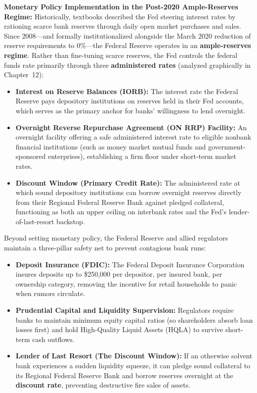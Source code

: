 \documentclass[11pt, oneside]{book}
\begin{document}
\textbf{Monetary Policy Implementation in the Post-2020 Ample-Reserves Regime:} Historically, textbooks described the Fed steering interest rates by rationing scarce bank reserves through daily open market purchases and sales. Since 2008—and formally institutionalized alongside the March 2020 reduction of reserve requirements to 0\%—the Federal Reserve operates in an \textbf{ample-reserves regime}. Rather than fine-tuning scarce reserves, the Fed controls the federal funds rate primarily through three \textbf{administered rates} (analyzed graphically in Chapter~12):
\begin{itemize}[leftmargin=1.5em, itemsep=3pt]
  \item \textbf{Interest on Reserve Balances (IORB):} The interest rate the Federal Reserve pays depository institutions on reserves held in their Fed accounts, which serves as the primary anchor for banks' willingness to lend overnight.
  \item \textbf{Overnight Reverse Repurchase Agreement (ON RRP) Facility:} An overnight facility offering a safe administered interest rate to eligible nonbank financial institutions (such as money market mutual funds and government-sponsored enterprises), establishing a firm floor under short-term market rates.
  \item \textbf{Discount Window (Primary Credit Rate):} The administered rate at which sound depository institutions can borrow overnight reserves directly from their Regional Federal Reserve Bank against pledged collateral, functioning as both an upper ceiling on interbank rates and the Fed's lender-of-last-resort backstop.
\end{itemize}

Beyond setting monetary policy, the Federal Reserve and allied regulators maintain a three-pillar safety net to prevent contagious bank runs:
\begin{itemize}[leftmargin=1.5em, itemsep=3pt]
  \item \textbf{Deposit Insurance (FDIC):} The Federal Deposit Insurance Corporation insures deposits up to \$250,000 per depositor, per insured bank, per ownership category, removing the incentive for retail households to panic when rumors circulate.
  \item \textbf{Prudential Capital and Liquidity Supervision:} Regulators require banks to maintain minimum equity capital ratios (so shareholders absorb loan losses first) and hold High-Quality Liquid Assets (HQLA) to survive short-term cash outflows.
  \item \textbf{Lender of Last Resort (The Discount Window):} If an otherwise solvent bank experiences a sudden liquidity squeeze, it can pledge sound collateral to its Regional Federal Reserve Bank and borrow reserves overnight at the \textbf{discount rate}, preventing destructive fire sales of assets.
\end{itemize}
\end{document}
